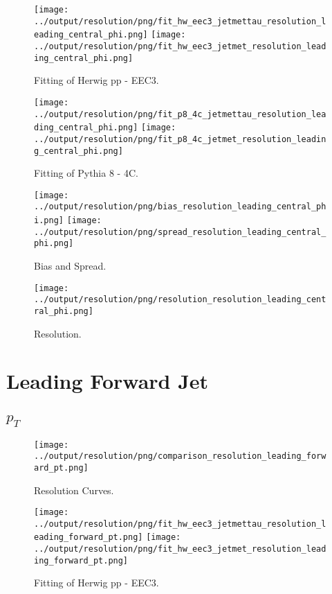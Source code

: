\documentclass[11pt]{book}
\begin{document}
\begin{figure}[ht]
\centering
\texttt{[image: ../output/resolution/png/fit\_hw\_eec3\_jetmettau\_resolution\_leading\_central\_phi.png]}
\texttt{[image: ../output/resolution/png/fit\_hw\_eec3\_jetmet\_resolution\_leading\_central\_phi.png]}
\caption{Fitting of Herwig pp - EEC3.}
\end{figure}

\begin{figure}[ht]
\centering
\texttt{[image: ../output/resolution/png/fit\_p8\_4c\_jetmettau\_resolution\_leading\_central\_phi.png]}
\texttt{[image: ../output/resolution/png/fit\_p8\_4c\_jetmet\_resolution\_leading\_central\_phi.png]}
\caption{Fitting of Pythia 8 - 4C.}
\end{figure}

\begin{figure}[ht]
\centering
\texttt{[image: ../output/resolution/png/bias\_resolution\_leading\_central\_phi.png]}
\texttt{[image: ../output/resolution/png/spread\_resolution\_leading\_central\_phi.png]}
\caption{Bias and Spread.}
\end{figure}


\begin{figure}[ht]
\centering
\texttt{[image: ../output/resolution/png/resolution\_resolution\_leading\_central\_phi.png]}
\caption{Resolution.}
\end{figure}
\clearpage

\chapter{Leading Forward Jet}
\section{$p_{T}$}

\begin{figure}[ht]
\centering
\texttt{[image: ../output/resolution/png/comparison\_resolution\_leading\_forward\_pt.png]}
\caption{Resolution Curves.}
\end{figure}


\begin{figure}[ht]
\centering
\texttt{[image: ../output/resolution/png/fit\_hw\_eec3\_jetmettau\_resolution\_leading\_forward\_pt.png]}
\texttt{[image: ../output/resolution/png/fit\_hw\_eec3\_jetmet\_resolution\_leading\_forward\_pt.png]}
\caption{Fitting of Herwig pp - EEC3.}
\end{figure}
\end{document}
